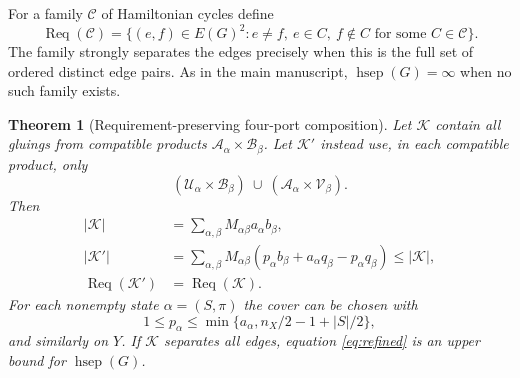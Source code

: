 \documentclass[10pt]{article}
\newtheorem{theorem}{Theorem}[section]
\newcommand{\hsep}{\operatorname{hsep}}
\newcommand{\Req}{\operatorname{Req}}
\begin{document}
For a family $\mathcal C$ of Hamiltonian cycles define
\[
 \Req(\mathcal C)=\{(e,f)\in E(G)^2:e\ne f,\ 
                    e\in C,\ f\notin C\text{ for some }C\in\mathcal C\}.
\]
The family strongly separates the edges precisely when this is the full set
of ordered distinct edge pairs. As in the main manuscript, $\hsep(G)=\infty$
when no such family exists.

\begin{theorem}[Requirement-preserving four-port composition]\label{thm:fourport}
Let $\mathcal K$ contain all gluings from compatible products
$\mathcal A_\alpha\times\mathcal B_\beta$. Let $\mathcal K'$ instead use,
in each compatible product, only
\[
 (\mathcal U_\alpha\times\mathcal B_\beta)
 \ \cup\ (\mathcal A_\alpha\times\mathcal V_\beta).
\]
Then
\begin{align}
 |\mathcal K|&=\sum_{\alpha,\beta}M_{\alpha\beta}a_\alpha b_\beta,
       \label{eq:full}\\
 |\mathcal K'|&=\sum_{\alpha,\beta}M_{\alpha\beta}
       (p_\alpha b_\beta+a_\alpha q_\beta-p_\alpha q_\beta)
       \le |\mathcal K|,\label{eq:refined}\\
 \Req(\mathcal K')&=\Req(\mathcal K).\label{eq:preservation}
\end{align}
For each nonempty state $\alpha=(S,\pi)$ the cover can be chosen with
\begin{equation}\label{eq:coverbound}
 1\le p_\alpha\le
 \min\{a_\alpha,n_X/2-1+|S|/2\},
\end{equation}
and similarly on $Y$. If $\mathcal K$ separates all edges, equation
\eqref{eq:refined} is an upper bound for $\hsep(G)$.
\end{theorem}
\end{document}
